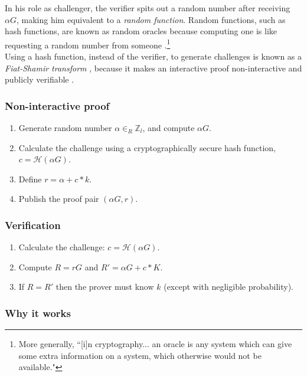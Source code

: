 In his role as challenger, the verifier spits out a random number after receiving $\alpha G$, making him equivalent to a {\em random function}. Random functions, such as hash functions, are known as random oracles because computing one is like requesting a random number from someone \cite{Signatures2015BorromeanRS}.\footnote{More generally, ``[i]n cryptography... an oracle is any system which can give some extra information on a system, which otherwise would not be available."\cite{cryptographic-oracle}}\\

\newpage
Using a hash function, instead of the verifier, to generate challenges is known as a {\em Fiat-Shamir transform} \cite{fiat-shamir-transform}, because it makes an interactive proof non-interactive and publicly verifiable \cite{Signatures2015BorromeanRS}.


\subsubsection*{Non-interactive proof}

\begin{enumerate}
	\item Generate random number $\alpha \in_R \mathbb{Z}_l$, and compute $\alpha G$.
	\item Calculate the challenge using a cryptographically secure hash function, \(c = \mathcal{H}(\alpha G)\).
	\item Define $r = \alpha + c*k$.
	\item Publish the proof pair $(\alpha G, r)$.
\end{enumerate}


\subsubsection*{Verification}

\begin{enumerate}
	\item Calculate the challenge: \(c = \mathcal{H}(\alpha G)\).
	\item Compute $R = r G$ and $R' = \alpha G + c*K$.
	\item If $R = R'$ then the prover must know $k$ (except with negligible probability).
\end{enumerate}

\subsubsection*{Why it works}

